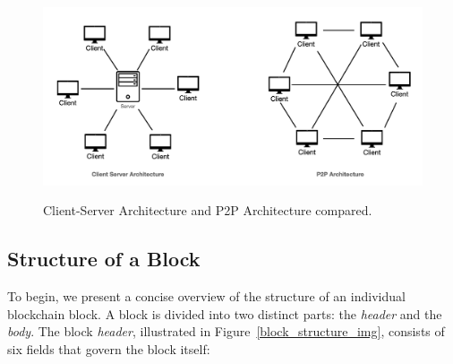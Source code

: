\begin{figure}[h]
    \centering
    \includegraphics[width=12cm,height=6cm]{Images/Chap1/client-server-vs-p2p.png}
    \caption[Client-Server Architecture and P2P Architecture compared.]{Client-Server Architecture and P2P Architecture compared.}
    \label{clientservervsp2p}
\end{figure}

\subsection{Structure of a Block}\label{block_structure}
To begin, we present a concise overview of the structure of an individual blockchain block. A block is divided into two distinct parts: the \textit{header} and the \textit{body}. The block \textit{header}, illustrated in Figure~\ref{block_structure_img}, consists of six fields that govern the block itself:

